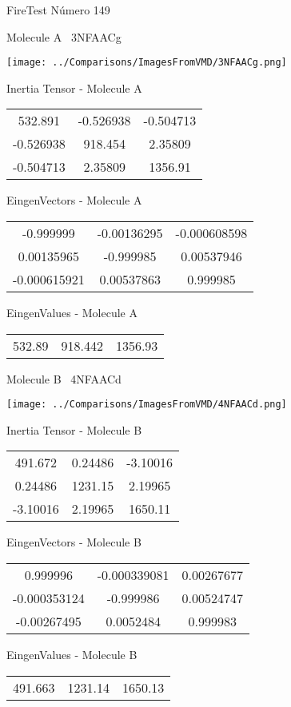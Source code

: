 \vtab[-3cm]
\begin{center}
{\large FireTest \tab Número 149}
\end{center}
\begin{multicols}{2}
\begin{center}

Molecule A \
3NFAACg

\texttt{[image: ../Comparisons/ImagesFromVMD/3NFAACg.png]}

Inertia Tensor - Molecule A \\
\begin{tabular}{|c c c|}
532.891	 & 	-0.526938	 & 	-0.504713	 \\
-0.526938	 & 	918.454	 & 	2.35809	 \\
-0.504713	 & 	2.35809	 & 	1356.91
\end{tabular}

\vtab
 EingenVectors - Molecule A     \\
\begin{tabular}{|c c c|}
-0.999999	 & 	-0.00136295	 & 	-0.000608598	 \\
0.00135965	 & 	-0.999985	 & 	0.00537946	 \\
-0.000615921	 & 	0.00537863	 & 	0.999985
\end{tabular}

\vtab
 EingenValues - Molecule A     \\
\begin{tabular}{|c c c|}
532.89	 & 	918.442	 & 	1356.93	 \\
\end{tabular}
\columnbreak

Molecule B \
4NFAACd

\texttt{[image: ../Comparisons/ImagesFromVMD/4NFAACd.png]}

Inertia Tensor - Molecule B \\
\begin{tabular}{|c c c|}
491.672	 & 	0.24486	 & 	-3.10016	 \\
0.24486	 & 	1231.15	 & 	2.19965	 \\
-3.10016	 & 	2.19965	 & 	1650.11
\end{tabular}

\vtab
 EingenVectors - Molecule B     \\
\begin{tabular}{|c c c|}
0.999996	 & 	-0.000339081	 & 	0.00267677	 \\
-0.000353124	 & 	-0.999986	 & 	0.00524747	 \\
-0.00267495	 & 	0.0052484	 & 	0.999983
\end{tabular}

\vtab
 EingenValues - Molecule B     \\
\begin{tabular}{|c c c|}
491.663	 & 	1231.14	 & 	1650.13	 \\
\end{tabular}

\end{center}
\end{multicols}

